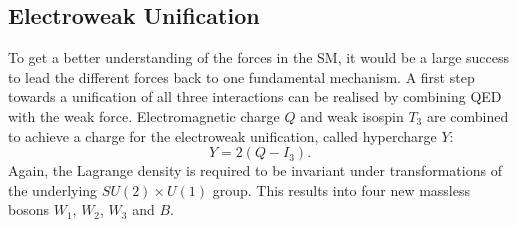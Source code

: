 	\subsection{Electroweak Unification}
	\label{sec:elw}	
	To get a better understanding of the forces in the SM, it would be a large success to lead the different forces back to one fundamental mechanism. A first step towards a unification of all three interactions can be realised by combining QED with the weak force. Electromagnetic charge $Q$ and weak isospin $T_3$ are combined to achieve a charge for the electroweak unification, called hypercharge $Y$:
	\begin{equation}
	Y = 2(Q-I_3).
	\end{equation}
	Again, the Lagrange density is required to be invariant under transformations of the underlying $SU(2) \times U(1)$ group. This results into four new massless bosons $W_1$, $W_2$, $W_3$ and $B$. 
